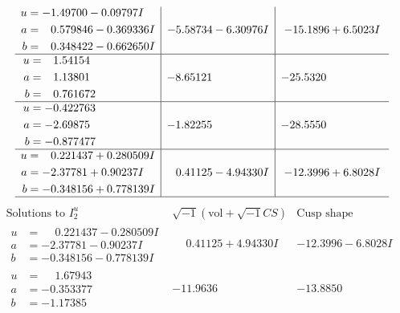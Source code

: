 \documentclass[1p]{elsarticle_modified}
\theoremstyle{definition}
\newcommand{\I}{\sqrt{-1}}
\begin{document}
$$\begin{array}{c|c|c}
\begin{aligned}
u &= -1.49700 - 0.09797 I \\
a &= \phantom{-}0.579846 - 0.369336 I \\
b &= \phantom{-}0.348422 - 0.662650 I\end{aligned}
 & -5.58734 - 6.30976 I & -15.1896 + 6.5023 I \\ \hline\begin{aligned}
u &= \phantom{-}1.54154\phantom{ +0.000000I} \\
a &= \phantom{-}1.13801\phantom{ +0.000000I} \\
b &= \phantom{-}0.761672\phantom{ +0.000000I}\end{aligned}
 & -8.65121\phantom{ +0.000000I} & -25.5320\phantom{ +0.000000I} \\ \hline\begin{aligned}
u &= -0.422763\phantom{ +0.000000I} \\
a &= -2.69875\phantom{ +0.000000I} \\
b &= -0.877477\phantom{ +0.000000I}\end{aligned}
 & -1.82255\phantom{ +0.000000I} & -28.5550\phantom{ +0.000000I} \\ \hline\begin{aligned}
u &= \phantom{-}0.221437 + 0.280509 I \\
a &= -2.37781 + 0.90237 I \\
b &= -0.348156 + 0.778139 I\end{aligned}
 & \phantom{-}0.41125 - 4.94330 I & -12.3996 + 6.8028 I\\
 \hline 
 \end{array}$$\newpage$$\begin{array}{c|c|c}  
\text{Solutions to }I^u_{2}& \I (\text{vol} + \sqrt{-1}CS) & \text{Cusp shape}\\
 \hline 
\begin{aligned}
u &= \phantom{-}0.221437 - 0.280509 I \\
a &= -2.37781 - 0.90237 I \\
b &= -0.348156 - 0.778139 I\end{aligned}
 & \phantom{-}0.41125 + 4.94330 I & -12.3996 - 6.8028 I \\ \hline\begin{aligned}
u &= \phantom{-}1.67943\phantom{ +0.000000I} \\
a &= -0.353377\phantom{ +0.000000I} \\
b &= -1.17385\phantom{ +0.000000I}\end{aligned}
 & -11.9636\phantom{ +0.000000I} & -13.8850\phantom{ +0.000000I} \\ \hline\begin{aligned}

\end{aligned}
\end{array}$$
\end{document}
